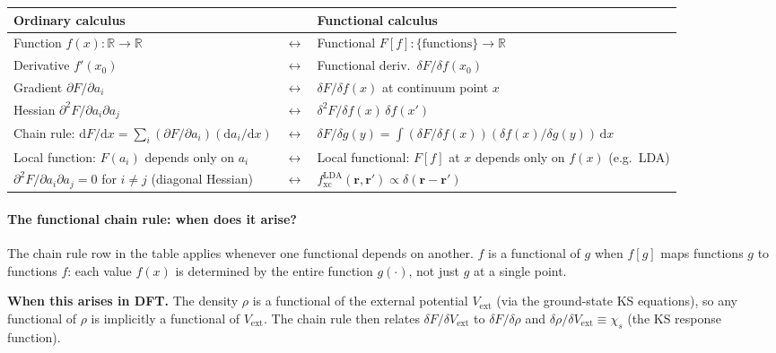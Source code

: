 \documentclass[12pt,letterpaper]{article}
\newcommand{\dd}{\mathrm{d}}
\newcommand{\fxc}{f_{\mathrm{xc}}}
\theoremstyle{definition}
\begin{document}
\begin{center}
\renewcommand{\arraystretch}{1.5}
\begin{tabular}{lll}
\toprule
\textbf{Ordinary calculus} & & \textbf{Functional calculus} \\
\midrule
Function $f(x):\mathbb{R}\to\mathbb{R}$ & $\longleftrightarrow$ &
  Functional $F[f]:\{\text{functions}\}\to\mathbb{R}$ \\
Derivative $f'(x_0)$ & $\longleftrightarrow$ &
  Functional deriv.\ $\delta F/\delta f(x_0)$ \\
Gradient $\partial F/\partial a_i$ & $\longleftrightarrow$ &
  $\delta F/\delta f(x)$ at continuum point $x$ \\
Hessian $\partial^2 F/\partial a_i\partial a_j$ & $\longleftrightarrow$ &
  $\delta^2 F/\delta f(x)\,\delta f(x')$ \\
Chain rule: $\dd F/\dd x = \sum_i (\partial F/\partial a_i)(\dd a_i/\dd x)$ &
  $\longleftrightarrow$ &
  $\delta F/\delta g(y) = \int (\delta F/\delta f(x))(\delta f(x)/\delta g(y))\,\dd x$ \\
Local function: $F(a_i)$ depends only on $a_i$ & $\longleftrightarrow$ &
  Local functional: $F[f]$ at $x$ depends only on $f(x)$ (e.g.\ LDA) \\
$\partial^2 F/\partial a_i\partial a_j = 0$ for $i\neq j$ (diagonal Hessian) &
  $\longleftrightarrow$ &
  $\fxc^{\mathrm{LDA}}(\bm{r},\bm{r}') \propto \delta(\bm{r}-\bm{r}')$ \\
\bottomrule
\end{tabular}
\renewcommand{\arraystretch}{1}
\end{center}

\paragraph{The functional chain rule: when does it arise?}
The chain rule row in the table applies whenever one functional depends on
another.
$f$ is a functional of $g$ when $f[g]$ maps functions $g$ to functions $f$:
each value $f(x)$ is determined by the entire function $g(\cdot)$, not just
$g$ at a single point.

\textbf{When this arises in DFT.}
The density $\rho$ is a functional of the external potential $V_\text{ext}$
(via the ground-state KS equations), so any functional of $\rho$ is
implicitly a functional of $V_\text{ext}$.
The chain rule then relates $\delta F/\delta V_\text{ext}$ to
$\delta F/\delta\rho$ and $\delta\rho/\delta V_\text{ext} \equiv \chi_s$
(the KS response function).
\end{document}
